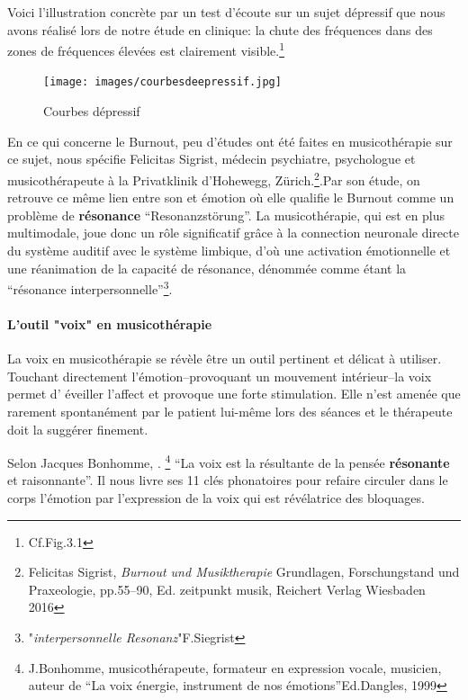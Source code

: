 Voici l'illustration concrète par un test
d'écoute sur un sujet dépressif que nous avons réalisé lors de notre
étude en clinique: la
chute des fréquences dans des zones de fréquences élevées est
clairement visible.\footnote{Cf.Fig.3.1}
 \begin{figure}
	\centering
	\texttt{[image: images/courbesdeepressif.jpg]}
	\caption{Courbes dépressif}
	\label{fig:courbes du dépressif}
      \end{figure}


      En ce qui concerne le Burnout, peu d'études ont été faites en musicothérapie
sur ce sujet, nous spécifie Felicitas Sigrist, médecin
psychiatre, psychologue et musicothérapeute à la Privatklinik
d'Hohewegg, Zürich.\autocite[pp.55--90,``Burnout und 
		Musiktherapie''] {sigrist_burnout_2016}\footnote{Felicitas Sigrist,  
\textit{Burnout und 
		Musiktherapie} Grundlagen, Forschungstand und Praxeologie, pp.55--90, Ed. 
	zeitpunkt musik, Reichert Verlag Wiesbaden 2016}.Par son étude, on retrouve ce 
	même lien entre son et 
émotion où elle qualifie le Burnout comme un problème de \textbf{résonance} ``Resonanzstörung''. La 
musicothérapie, qui est en plus multimodale, joue donc un rôle significatif grâce à la 
connection 
neuronale directe du système auditif avec le système limbique, d'où une activation 
émotionnelle et une  réanimation de  la capacité de résonance, dénommée comme 
étant la 
``résonance interpersonnelle''\footnote{"\textit{interpersonnelle Resonanz}"F.Siegrist}.

\paragraph{L'outil "voix" en musicothérapie}

La voix en musicothérapie se révèle être un outil pertinent et délicat
à utiliser. Touchant 
directement 
l'émotion--provoquant un mouvement intérieur--la voix permet d'
éveiller l'affect
et provoque une forte stimulation. Elle n'est amenée que rarement
spontanément par le patient lui-même lors des séances et le thérapeute doit la suggérer
finement.

Selon Jacques Bonhomme, .\autocite[pp.55--90,``Burnout und 
		Musiktherapie''] {sigrist_burnout_2016} \footnote{J.Bonhomme, musicothérapeute, formateur 
  	en expression vocale, musicien, auteur de ``La voix énergie,
        instrument de nos émotions''Ed.Dangles, 1999} ``La voix est la
      résultante de la pensée \textbf{résonante}  et raisonnante''.
      Il nous livre ses 11 clés phonatoires pour refaire circuler dans
      le corps 
      l'émotion par l'expression de la voix qui est révélatrice des bloquages.


